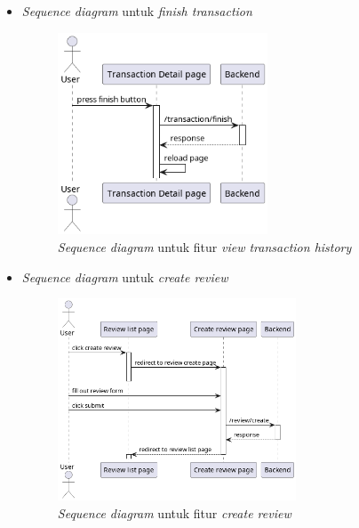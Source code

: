 \documentclass[a4paper]{article}
\begin{document}
\begin{enumerate}
\begin{enumerate}
\begin{itemize}
            \newpage
            \item \textit{Sequence diagram} untuk \textit{finish transaction}
            \begin{figure}[h]
                \centering
                \includegraphics*[height=6cm]{diagram/sequence diagram/FE/15. transaction/finish transaction/template.png}
                \caption{\textit{Sequence diagram} untuk fitur \textit{view transaction history}}
            \end{figure}

            \item \textit{Sequence diagram} untuk \textit{create review}
            \begin{figure}[h]
                \centering
                \includegraphics*[height=6cm]{diagram/sequence diagram/FE/16. review/create review/template.png}
                \caption{\textit{Sequence diagram} untuk fitur \textit{create review}}
            \end{figure}


\end{itemize}
\end{enumerate}
\end{enumerate}
\end{document}
